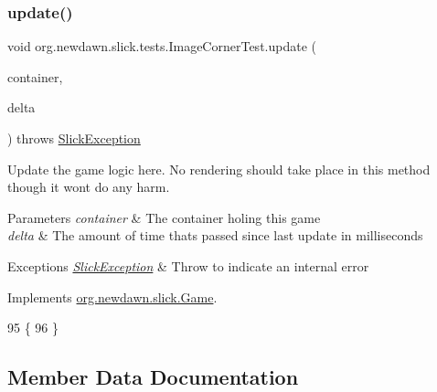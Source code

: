 \subsubsection{\texorpdfstring{update()}{update()}}
{\footnotesize\ttfamily void org.\+newdawn.\+slick.\+tests.\+Image\+Corner\+Test.\+update (\begin{DoxyParamCaption}\item[{\mbox{\hyperlink{classorg_1_1newdawn_1_1slick_1_1_game_container}{Game\+Container}}}]{container,  }\item[{int}]{delta }\end{DoxyParamCaption}) throws \mbox{\hyperlink{classorg_1_1newdawn_1_1slick_1_1_slick_exception}{Slick\+Exception}}\hspace{0.3cm}{\ttfamily [inline]}}

Update the game logic here. No rendering should take place in this method though it won\textquotesingle{}t do any harm.


\begin{DoxyParams}{Parameters}
{\em container} & The container holing this game \\
\hline
{\em delta} & The amount of time thats passed since last update in milliseconds \\
\hline
\end{DoxyParams}

\begin{DoxyExceptions}{Exceptions}
{\em \mbox{\hyperlink{classorg_1_1newdawn_1_1slick_1_1_slick_exception}{Slick\+Exception}}} & Throw to indicate an internal error \\
\hline
\end{DoxyExceptions}


Implements \mbox{\hyperlink{interfaceorg_1_1newdawn_1_1slick_1_1_game_ab07b2e9463ee4631620dde0de25bdee8}{org.\+newdawn.\+slick.\+Game}}.


\begin{DoxyCode}
95                                                                                  \{
96     \}
\end{DoxyCode}


\subsection{Member Data Documentation}
\mbox{\label{classorg_1_1newdawn_1_1slick_1_1tests_1_1_image_corner_test_ac43e9974d6954165e5af5b8d748df6a0}} 
